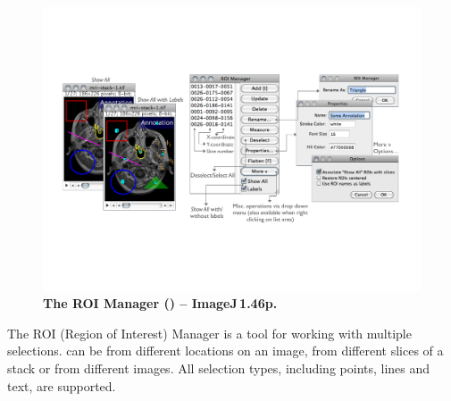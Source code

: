 \begin{figure}[h]
\noindent \includegraphics[width=1\columnwidth]{images/ROIManager}

\noindent \caption[ROI Manager]{\textbf{\label{fig:The-ROI-Manager}The ROI Manager (\protect{})
-- ImageJ\,1.46p.}}
\end{figure}
The ROI (Region of Interest) Manager
is a tool for working with multiple selections. 
can be from different locations on an image, from different slices
of a stack or from different images. All selection types, including
points, lines and text, are supported.
